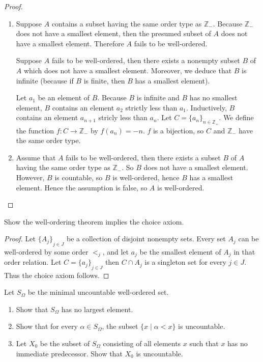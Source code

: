 \begin{proof}
    \begin{enumerate}[label={(\alph*)}]
        \item Suppose $A$ contains a subset having the same order type as $\mathbb{Z}_{-}$. Because $\mathbb{Z}_{-}$ does not have a smallest element, then the presumed subset of $A$ does not have a smallest element. Therefore $A$ fails to be well-ordered.

              Suppose $A$ fails to be well-ordered, then there exists a nonempty subset $B$ of $A$ which does not have a smallest element. Moreover, we deduce that $B$ is infinite (because if $B$ is finite, then $B$ has a smallest element).

              Let $a_{1}$ be an element of $B$. Because $B$ is infinite and $B$ has no smallest element, $B$ contains an element $a_{2}$ strictly less than $a_{1}$. Inductively, $B$ contains an element $a_{n+1}$ stricly less than $a_{n}$. Let $C = {\{ a_{n} \}}_{n\in\mathbb{Z}_{+}}$. We define the function $f: C \to \mathbb{Z}_{-}$ by $f(a_{n}) = -n$. $f$ is a bijection, so $C$ and $\mathbb{Z}_{-}$ have the same order type.
        \item Assume that $A$ fails to be well-ordered, then there exists a subset $B$ of $A$ having the same order type as $\mathbb{Z}_{-}$. So $B$ does not have a smallest element. However, $B$ is countable, so $B$ is well-ordered, hence $B$ has a smallest element. Hence the assumption is false, so $A$ is well-ordered.
    \end{enumerate}
\end{proof}

\begin{exercise}\label{chapter1:section10:exercise5}
    Show the well-ordering theorem implies the choice axiom.
\end{exercise}

\begin{proof}
    Let ${\{ A_{j} \}}_{j\in J}$ be a collection of disjoint nonempty sets. Every set $A_{j}$ can be well-ordered by some order $<_{j}$, and let $a_{j}$ be the smallest element of $A_{j}$ in that order relation. Let $C = {\{ a_{j} \}}_{j\in J}$ then $C\cap A_{j}$ is a singleton set for every $j\in J$. Thus the choice axiom follows.
\end{proof}

\begin{exercise}\label{chapter1:section10:exercise6}
    Let $S_{\Omega}$ be the minimal uncountable well-ordered set.
    \begin{enumerate}[label={(\alph*)}]
        \item Show that $S_{\Omega}$ has no largest element.
        \item Show that for every $\alpha\in S_{\Omega}$, the subset $\{ x \mid \alpha < x \}$ is uncountable.
        \item Let $X_{0}$ be the subset of $S_{\Omega}$ consisting of all elements $x$ such that $x$ has no immediate predecessor. Show that $X_{0}$ is uncountable.
    \end{enumerate}
\end{exercise}

